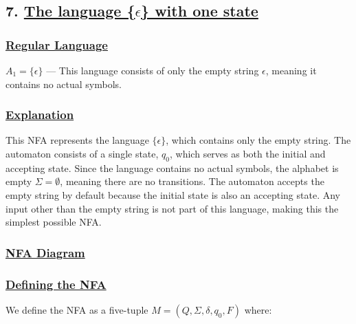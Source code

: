 \documentclass[12pt]{article}
\begin{document}
	
	\newpage
	\subsection*{7. \underline{The language \{\(\epsilon\)\} with one state} } \vspace{2mm} 
	
	\subsubsection*{\underline{Regular Language}} 
	\begin{tcolorbox}[colback=white, colframe=black, arc=0mm]
		\( A_1 = \{ \epsilon \} \) --- This language consists of only the empty string \( \epsilon \), meaning it contains no actual symbols.
	\end{tcolorbox}
		\subsubsection*{\underline{Explanation}} 
	This NFA represents the language \(\{\epsilon\}\), which contains only the empty string. The automaton consists of a single state, \(q_0\), which serves as both the initial and accepting state. Since the language contains no actual symbols, the alphabet is empty \(\Sigma = \emptyset\), meaning there are no transitions. The automaton accepts the empty string by default because the initial state is also an accepting state. Any input other than the empty string is not part of this language, making this the simplest possible NFA.
	\subsubsection*{\underline{NFA Diagram}} 
	\begin{center} 
	\end{center} 
	
	\subsubsection*{\underline{Defining the NFA}} 
	We define the NFA as a five-tuple \(M = (Q, \Sigma, \delta, q_0, F)\) where: 
	
\end{document}
